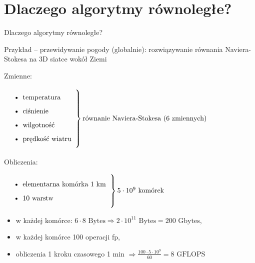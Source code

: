 \section{Dlaczego algorytmy równoległe?}

\begin{frame}{Dlaczego algorytmy równoległe?}

\begin{exampleblock}{Przykład -- przewidywanie pogody (globalnie):}
rozwiązywanie równania Naviera-Stokesa na 3D siatce wokół Ziemi

Zmienne:

  $\left. \parbox{10em}
{\begin{itemize}
   \item \text{temperatura}
   \item \text{ciśnienie}
   \item \text{wilgotność}
   \item \text{prędkość wiatru}
  \end{itemize}}
\right \} \text{równanie Naviera-Stokesa (6 zmiennych)}$
\end{exampleblock}

Obliczenia:

$\left. \parbox{15em}
{\begin{itemize}
   \item \text{elementarna komórka 1 km}
   \item \text{10 warstw}
  \end{itemize}}
\right \} 5\cdot10^9\text{ komórek}$

\begin{itemize}
    \item w każdej komórce:
	$6\cdot 8 \text{ Bytes} \Rightarrow 2\cdot 10^{11} \text{ Bytes} = 200 \text{ Gbytes}$,

    \item w każdej komórce 100 operacji fp,
    \item obliczenia 1 kroku czasowego 1 min $\Rightarrow \frac{100\cdot5\cdot10^9}{60} = 8 \text{ GFLOPS}$
 \end{itemize}

\end{frame}
